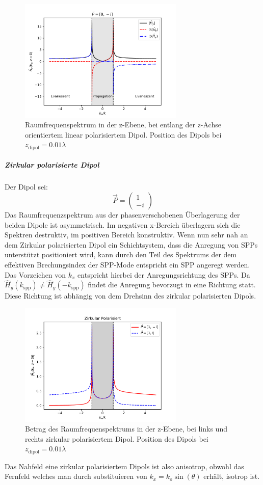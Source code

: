 \documentclass{article}
\begin{document}
		\begin{figure}[h] 
			\centering
			\includegraphics[width=0.7\textwidth]{figures/spatial_spectrum_z.pdf}
			\caption{Raumfrequenspektrum in der z-Ebene, bei entlang der z-Achse orientiertem linear polarisiertem Dipol. Position des Dipols bei $z_{\mathrm{dipol}} = 0.01 \lambda$}
			\label{fig:spatial_spectrum_z}
		\end{figure}
		\subparagraph{Zirkular polarisierte Dipol}
			Der Dipol sei:
			$$\vec{P} = \begin{pmatrix} 1 \\ -i\end{pmatrix}$$
			Das Raumfrequenzspektrum aus der phasenverschobenen Überlagerung der beiden Dipole ist asymmetrisch. Im negativen x-Bereich überlagern sich die Spektren destruktiv, im positiven Bereich konstruktiv. Wenn nun sehr nah an dem Zirkular polarisierten Dipol ein Schichtsystem, dass die Anregung von SPPs unterstützt positioniert wird, kann durch den Teil des Spektrums der dem effektiven Brechungsindex der SPP-Mode entspricht ein SPP angeregt werden. Das Vorzeichen von $k_x$ entspricht hierbei der Anregungsrichtung des SPPs. Da $\hat{H}_y(k_{\mathrm{spp}}) \neq \hat{H}_y( -k_{\mathrm{spp}}) $ findet die Anregung bevorzugt in eine Richtung statt. Diese Richtung ist abhängig von dem Drehsinn des zirkular polarisierten Dipols.
			\begin{figure}[h] 
				\centering
				\includegraphics[width=0.7\textwidth]{figures/spatial_spectrum_circ.pdf}
				\caption{Betrag des Raumfrequenspektrums in der z-Ebene, bei links und rechts zirkular polarisiertem Dipol. Position des Dipols bei $z_{\mathrm{dipol}} = 0.01 \lambda$}
				\label{fig:spatial_spectrum_circ}
			\end{figure}
		Das Nahfeld eine zirkular polarisiertem Dipols ist also anisotrop, obwohl das Fernfeld welches man durch substituieren von $k_x = k_o \sin(\theta)$ erhält, isotrop ist.	
\end{document}
